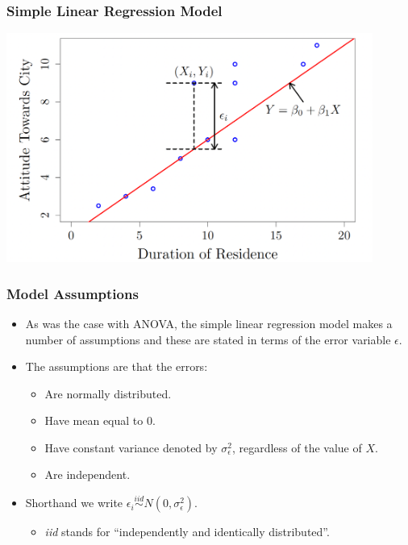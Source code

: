\documentclass[12pt]{beamer}
\begin{document}
\begin{frame}
	\frametitle{Simple Linear Regression Model}
	\centering
	\includegraphics[width=12cm]{simple.png}
	
\end{frame}
\begin{frame}
	\frametitle{\color{blue}Model Assumptions}
	
	\begin{itemize}[label={\color{blue}$\blacktriangleright$}]
		\item As was the case with ANOVA, the simple linear regression model makes a number of assumptions and these are stated in terms of the error variable $\epsilon$.
		
		\item The assumptions are that the errors:
		\begin{itemize}[label={\color{blue}$\blacktriangleright$}]
			\item Are normally distributed.
			\item Have mean equal to 0.
			\item Have constant variance denoted by $\sigma_\epsilon^2$, regardless of the value of $X$.
			\item Are independent.
		\end{itemize}
		
		\item Shorthand we write $\epsilon_i \stackrel{iid}{\sim} N(0,\sigma_\epsilon^2)$.
		\begin{itemize}[label={\color{blue}$\blacktriangleright$}]
			\item \textit{iid} stands for ``independently and identically distributed''.
		\end{itemize}
	\end{itemize}
	
\end{frame}
\end{document}
